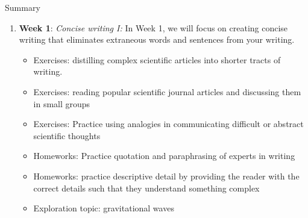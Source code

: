 \documentclass{beamer}
\begin{document}
\begin{frame}{Summary}
\begin{enumerate}
\item \textbf{Week 1}: \textit{Concise writing I:} In Week 1, we will focus on creating concise writing that eliminates extraneous words and sentences from your writing.
\begin{itemize}
\item Exercises: distilling complex scientific articles into shorter tracts of writing.
\item Exercises: reading popular scientific journal articles and discussing them in small groups
\item Exercises: Practice using analogies in communicating difficult or abstract scientific thoughts
\item Homeworks: Practice quotation and paraphrasing of experts in writing
\item Homeworks: practice descriptive detail by providing the reader with the correct details such that they understand something complex
\item Exploration topic: gravitational waves
\end{itemize}
\end{enumerate}
\end{frame}
\end{document}
